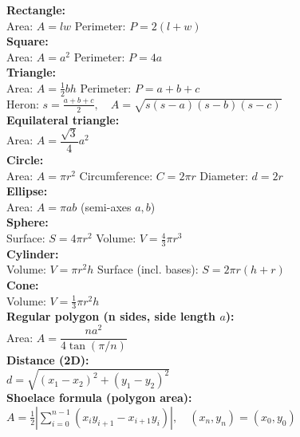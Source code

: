 \textbf{Rectangle:} \\[1mm]
Area: $A = l w$ \quad Perimeter: $P = 2(l+w)$ \\

\textbf{Square:} \\[1mm]
Area: $A = a^2$ \quad Perimeter: $P = 4a$ \\

\textbf{Triangle:} \\[1mm]
Area: $A = \tfrac{1}{2} b h$ \quad Perimeter: $P=a+b+c$ \\
Heron: $s=\tfrac{a+b+c}{2},\quad A=\sqrt{s(s-a)(s-b)(s-c)}$ \\

\textbf{Equilateral triangle:} \\[1mm]
Area: $A=\dfrac{\sqrt{3}}{4}a^2$ \\

\textbf{Circle:} \\[1mm]
Area: $A=\pi r^2$ \quad Circumference: $C=2\pi r$ \quad Diameter: $d=2r$ \\

\textbf{Ellipse:} \\[1mm]
Area: $A=\pi ab$ (semi-axes $a,b$) \\

\textbf{Sphere:} \\[1mm]
Surface: $S=4\pi r^2$ \quad Volume: $V=\tfrac{4}{3}\pi r^3$ \\

\textbf{Cylinder:} \\[1mm]
Volume: $V=\pi r^2 h$ \quad Surface (incl. bases): $S=2\pi r(h+r)$ \\

\textbf{Cone:} \\[1mm]
Volume: $V=\tfrac{1}{3}\pi r^2 h$ \\

\textbf{Regular polygon (n sides, side length $a$):} \\[1mm]
Area: $A = \dfrac{n a^2}{4\tan(\pi/n)}$ \\

\textbf{Distance (2D):} \\[1mm]
$d=\sqrt{(x_1-x_2)^2+(y_1-y_2)^2}$ \\

\textbf{Shoelace formula (polygon area):} \\[1mm]
$A=\tfrac12\left|\sum_{i=0}^{n-1} (x_i y_{i+1}-x_{i+1} y_i)\right|,\quad (x_n,y_n)=(x_0,y_0)$ \\